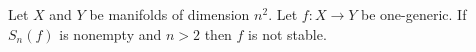 Let $X$ and $Y$ be manifolds of dimension $n^2$. Let $f: X \rightarrow Y$ be one-generic. If $S_n(f)$ is nonempty and $n > 2$ then $f$ is not stable.

